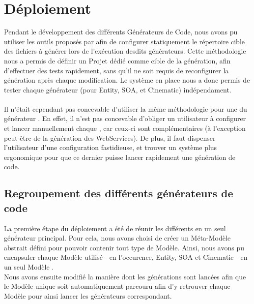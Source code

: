 \section{Déploiement}

Pendant le développement des différents Générateurs de Code, nous avons pu utiliser les outils proposés par \kweclipse afin de configurer statiquement le répertoire cible des fichiers à générer lors de l'exécution desdits générateurs. Cette méthodologie nous a permis de définir un Projet \kwplay dédié comme cible de la génération, afin d'effectuer des tests rapidement, sans qu'il ne soit requis de reconfigurer la génération après chaque modification. Le système en place nous a donc permis de tester chaque générateur (pour Entity, SOA, et Cinematic) indépendament.
\\\\
Il n'était cependant pas concevable d'utiliser la même méthodologie pour une  du générateur \kwplay. En effet, il n'est pas concevable d'obliger un utilisateur à configurer et lancer manuellement chaque , car ceux-ci sont complémentaires (à l'exception peut-être de la génération des WebServices). De plus, il faut dispenser l'utilisateur d'une configuration fastidieuse, et trouver un système plus ergonomique pour que ce dernier puisse lancer rapidement une génération de code.

\subsection{Regroupement des différents générateurs de code}

La première étape du déploiement a été de réunir les différents  en un seul générateur principal. Pour cela, nous avons choisi de créer un Méta-Modèle abstrait défini pour pouvoir contenir tout type de Modèle. Ainsi, nous avons pu encapsuler chaque Modèle utilisé - en l'occurence, Entity, SOA et Cinematic - en un seul Modèle .
\\
Nous avons ensuite modifié la manière dont les générations sont lancées afin que le Modèle unique soit automatiquement parcouru afin d'y retrouver chaque Modèle pour ainsi lancer les générateurs correspondant.

